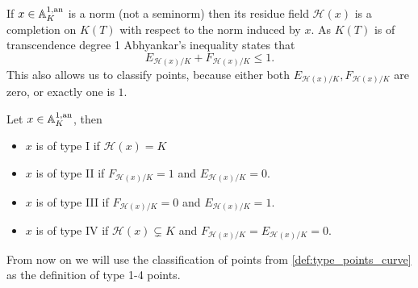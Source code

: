 If $x \in \mathbb{A}_K^{1, \text{an}}$ is a norm (not a seminorm) then its residue field $\mathcal{H} (x)$ is a completion on $K(T)$ with respect to the norm induced by $x$. As $K(T)$ is of transcendence degree 1 Abhyankar's inequality states that \[
	E_{\mathcal{H} (x) / K} + F_{\mathcal{H} (x) / K} \le 1
.\] 
This also allows us to classify points, because either both $E_{\mathcal{H} (x) / K}, F_{\mathcal{H} (x) / K}$ are zero, or exactly one is $1$. 
\begin{proposition}\label{def:type_points_curve}
	Let $x \in \mathbb{A}_K^{1, \text{an}}$, then 
	\begin{itemize}
		\item $x$ is of type I if $\mathcal{H} (x) = K$
		\item $x$ is of type II if $F_{\mathcal{H} (x) / K} = 1$ and $E_{\mathcal{H} (x) / K} = 0$. 
		\item $x$ is of type III if $F_{\mathcal{H} (x) / K} = 0$ and $E_{\mathcal{H} (x) / K} = 1$.
		\item $x$ is of type IV if $\mathcal{H} (x) \subsetneq K$ and  $F_{\mathcal{H} (x) / K} = E_{\mathcal{H} (x) / K} = 0$.
	\end{itemize}
\end{proposition}

\begin{remark}
	From now on we will use the classification of points from \cref{def:type_points_curve} as the definition of type 1-4 points.
\end{remark}


